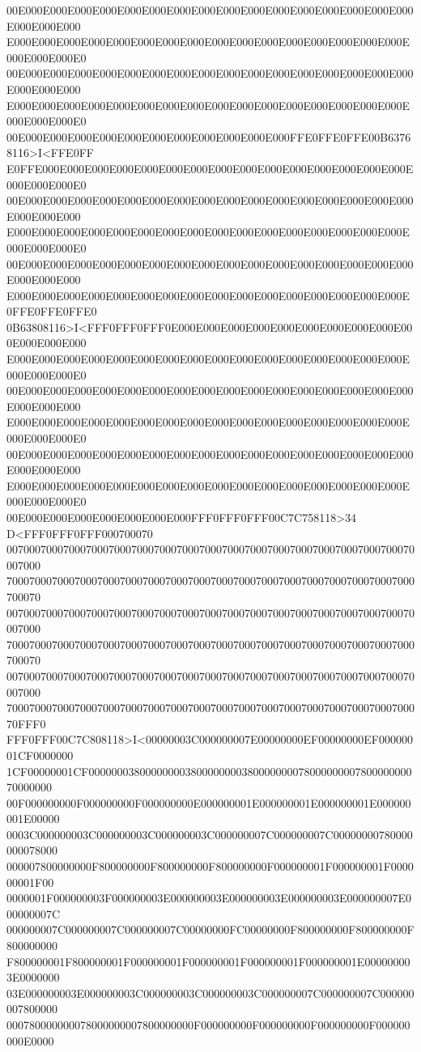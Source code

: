 00E000E000E000E000E000E000E000E000E000E000E000E000E000E000E000E000E000E000E000
E000E000E000E000E000E000E000E000E000E000E000E000E000E000E000E000E000E000E000E0
00E000E000E000E000E000E000E000E000E000E000E000E000E000E000E000E000E000E000E000
E000E000E000E000E000E000E000E000E000E000E000E000E000E000E000E000E000E000E000E0
00E000E000E000E000E000E000E000E000E000E000E000FFE0FFE0FFE00B63768116>I<FFE0FF
E0FFE000E000E000E000E000E000E000E000E000E000E000E000E000E000E000E000E000E000E0
00E000E000E000E000E000E000E000E000E000E000E000E000E000E000E000E000E000E000E000
E000E000E000E000E000E000E000E000E000E000E000E000E000E000E000E000E000E000E000E0
00E000E000E000E000E000E000E000E000E000E000E000E000E000E000E000E000E000E000E000
E000E000E000E000E000E000E000E000E000E000E000E000E000E000E000E000E0FFE0FFE0FFE0
0B63808116>I<FFF0FFF0FFF0E000E000E000E000E000E000E000E000E000E000E000E000E000
E000E000E000E000E000E000E000E000E000E000E000E000E000E000E000E000E000E000E000E0
00E000E000E000E000E000E000E000E000E000E000E000E000E000E000E000E000E000E000E000
E000E000E000E000E000E000E000E000E000E000E000E000E000E000E000E000E000E000E000E0
00E000E000E000E000E000E000E000E000E000E000E000E000E000E000E000E000E000E000E000
E000E000E000E000E000E000E000E000E000E000E000E000E000E000E000E000E000E000E000E0
00E000E000E000E000E000E000E000FFF0FFF0FFF00C7C758118>34 D<FFF0FFF0FFF000700070
007000700070007000700070007000700070007000700070007000700070007000700070007000
700070007000700070007000700070007000700070007000700070007000700070007000700070
007000700070007000700070007000700070007000700070007000700070007000700070007000
700070007000700070007000700070007000700070007000700070007000700070007000700070
007000700070007000700070007000700070007000700070007000700070007000700070007000
70007000700070007000700070007000700070007000700070007000700070007000700070FFF0
FFF0FFF00C7C808118>I<00000003C000000007E00000000EF00000000EF00000001CF0000000
1CF00000001CF00000003800000000380000000038000000007800000000780000000070000000
00F000000000F000000000F000000000E000000001E000000001E000000001E000000001E00000
0003C000000003C000000003C000000003C000000007C000000007C00000000780000000078000
000007800000000F800000000F800000000F800000000F000000001F000000001F000000001F00
0000001F000000003F000000003E000000003E000000003E000000003E000000007E000000007C
000000007C000000007C000000007C00000000FC00000000F800000000F800000000F800000000
F800000001F800000001F000000001F000000001F000000001F000000001E000000003E0000000
03E000000003E000000003C000000003C000000003C000000007C000000007C000000007800000
000780000000078000000007800000000F000000000F000000000F000000000F000000000E0000
